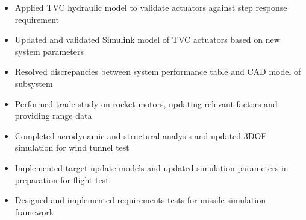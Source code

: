 \documentclass{resume}
\begin{document}
\begin{itemize}
    \item Applied TVC hydraulic model to validate actuators against step response requirement
    \item Updated and validated Simulink model of TVC actuators based on new system parameters
    \item Resolved discrepancies between system performance table and CAD model of subsystem
\end{itemize}
\begin{itemize}
    \item Performed trade study on rocket motors, updating relevant factors and providing range data
    \item Completed aerodynamic and structural analysis and updated 3DOF simulation for wind tunnel test
    \item Implemented target update models and updated simulation parameters in preparation for flight test
    \item Designed and implemented requirements tests for missile simulation framework
\end{itemize}
\end{document}
